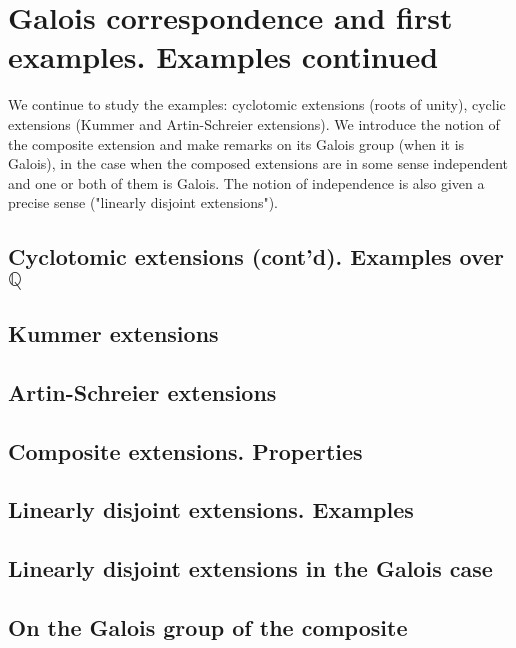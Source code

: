 \chapter{Galois correspondence and first examples. Examples continued}
We continue to study the examples: cyclotomic extensions (roots of
unity), cyclic extensions (Kummer and Artin-Schreier extensions). We
introduce the notion of the composite extension and make remarks on
its Galois group (when it is Galois), in the case when the composed
extensions are in some sense independent and one or both of them is
Galois. The notion of independence is also given a precise sense
("linearly disjoint extensions").


\section{Cyclotomic extensions (cont'd). Examples over $\mathbb{Q}$}

\section{Kummer extensions}
\section{Artin-Schreier extensions}
\section{Composite extensions. Properties}
\section{Linearly disjoint extensions. Examples}
\section{Linearly disjoint extensions in the Galois case}
\section{On the Galois group of the composite}
